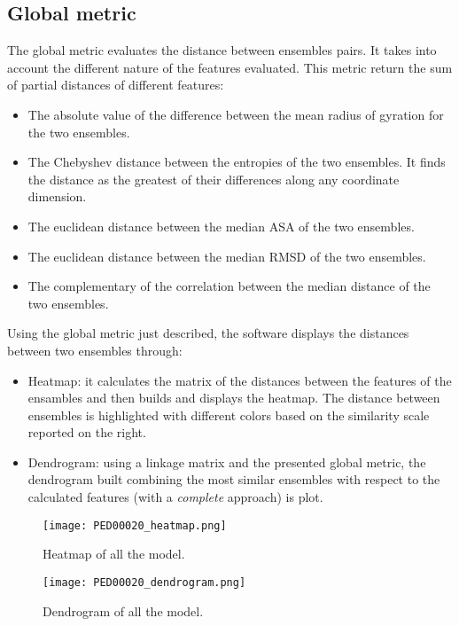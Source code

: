 \subsection{Global metric}
The global metric evaluates the distance between ensembles pairs. It takes into account the different nature of the features evaluated.
This metric return the sum of partial distances of different features:
\begin{itemize}
\item The absolute value of the difference between the mean radius of gyration for the two ensembles.
\item The Chebyshev distance between the entropies of the two ensembles. It finds the distance as the greatest of their differences along any coordinate dimension.
\item The euclidean distance between the median ASA of the two ensembles.
\item The euclidean distance between the median RMSD of the two ensembles.
\item The complementary of the correlation between the median distance of the two ensembles.
\end{itemize}


Using the global metric just described, the software displays the distances between two ensembles through:
\begin{itemize}
\item Heatmap: it calculates the matrix of the distances between the features of the ensambles and then builds and displays the heatmap. The distance between ensembles is highlighted with different colors based on the similarity scale reported on the right. 
\item Dendrogram: using a linkage matrix and the presented global metric, the dendrogram built combining the most similar ensembles with respect to the calculated features (with a \emph{complete} approach) is plot.
\end{itemize}

\begin{figure}[H]
	\begin{minipage}[b]{0.93\textwidth}
		\centering
		\texttt{[image: PED00020\_heatmap.png]}
		\caption{Heatmap of all the model.}
		\label{heatmap}
	\end{minipage}
\end{figure}
\begin{figure}
	\begin{minipage}[b]{0.93\textwidth}
		\centering
		\texttt{[image: PED00020\_dendrogram.png]}
		\caption{Dendrogram of all the model.}
		\label{dendrogram}
	\end{minipage}
\end{figure}

